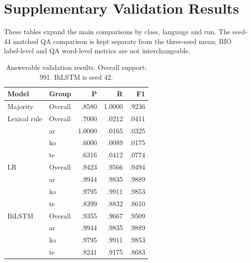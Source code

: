 \documentclass[11pt]{article}
\begin{document}
\section{Supplementary Validation Results}
\label{app:results}
These tables expand the main comparisons by class, language and run. The seed-44 matched QA comparison is kept separate from the three-seed mean; BIO label-level and QA word-level metrics are not interchangeable.
\begin{table}[H]
\centering\small\setlength{\tabcolsep}{4pt}
\begin{tabular}{llrrr}
\toprule
Model & Group & P & R & F1\\
\midrule
Majority & Overall & .8580 & 1.0000 & .9236\\
\midrule
Lexical rule & Overall & .7000 & .0212 & .0411\\
 & ar & 1.0000 & .0165 & .0325\\
 & ko & .6000 & .0089 & .0175\\
 & te & .6316 & .0412 & .0774\\
\midrule
LR & Overall & .9423 & .9566 & .9494\\
 & ar & .9944 & .9835 & .9889\\
 & ko & .9795 & .9911 & .9853\\
 & te & .8399 & .8832 & .8610\\
\midrule
BiLSTM & Overall & .9355 & .9667 & .9509\\
 & ar & .9944 & .9835 & .9889\\
 & ko & .9795 & .9911 & .9853\\
 & te & .8241 & .9175 & .8683\\
\bottomrule
\end{tabular}
\caption{Answerable validation results. Overall support: 991. BiLSTM is seed 42.}
\end{table}
\end{document}
